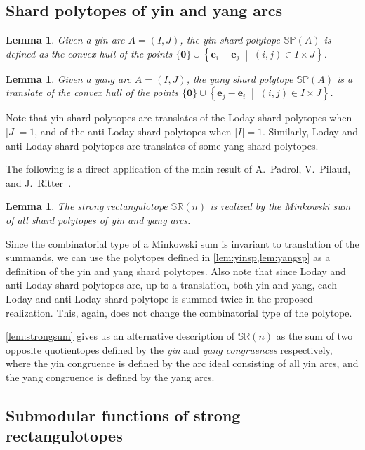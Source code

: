 \documentclass{amsart}
\newtheorem{lemma}[theorem]{Lemma}
\theoremstyle{definition}
\renewcommand{\b}[1]{{\boldsymbol{#1}}} %
\newcommand{\set}[2]{\left\{ #1 \;\middle|\; #2 \right\}} %
\newcommand{\darkblue}{\color{darkblue}} %
\newcommand{\defn}[1]{\textsl{\darkblue #1}} %
\newcommand{\polytope}[1]{\mathds{#1}} %
\newcommand{\SRP}{\polytope{SR}} %
\newcommand{\SP}{\polytope{SP}}
\begin{document}
\subsection{Shard polytopes of yin and yang arcs}

\begin{lemma}
  \label{lem:yinsp}
  Given a yin arc $A=(I,J)$, the yin shard polytope $\SP(A)$ is defined as the convex hull of the points
  $\{\b{0}\} \cup \set{\b{e}_i - \b{e}_j}{(i,j)\in I\times J}$.
\end{lemma}

\begin{lemma}
  \label{lem:yangsp}
  Given a yang arc $A=(I,J)$, the yang shard polytope $\SP(A)$ is a translate of the convex hull of the points
  $\{\b{0}\} \cup \set{\b{e}_j - \b{e}_i}{(i,j)\in I\times J}$.
\end{lemma}

Note that yin shard polytopes are translates of the Loday shard polytopes when $|J|=1$, and of the anti-Loday shard polytopes when $|I|=1$.
Similarly, Loday and anti-Loday shard polytopes are translates of some yang shard polytopes.

The following is a direct application of the main result of A.~Padrol, V.~Pilaud, and J.~Ritter~\cite{MR4584712}.

\begin{lemma}
  \label{lem:strongMinkowski}
  The strong rectangulotope $\SRP(n)$ is realized by the Minkowski sum of all shard polytopes of yin and yang arcs.
\end{lemma}

Since the combinatorial type of a Minkowski sum is invariant to translation of the summands, we can use the polytopes defined in \cref{lem:yinsp,lem:yangsp} as a definition of the yin and yang shard polytopes.
Also note that since Loday and anti-Loday shard polytopes are, up to a translation, both yin and yang, each Loday and anti-Loday shard polytope is summed twice in the proposed realization.
This, again, does not change the combinatorial type of the polytope.

\cref{lem:strongsum} gives us an alternative description of $\SRP(n)$ as the sum of two opposite quotientopes defined by the \defn{yin} and \defn{yang congruences} respectively, where the yin congruence is defined by the arc ideal consisting of all yin arcs, and the yang congruence is defined by the yang arcs.

\subsection{Submodular functions of strong rectangulotopes}
\end{document}
